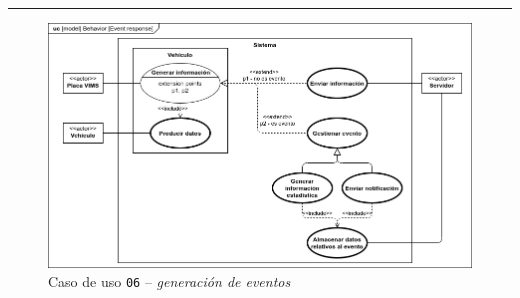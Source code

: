 \noindent\rule{\linewidth}{.2pt}

\begin{figure}[H]
  \centering
  \includegraphics[width=\linewidth]{diagrams/UseCases-UC6 - reaction.png}
  \caption{Caso de uso \texttt{06} -- \textit{generación de eventos}}
  \label{uc:reaction}
\end{figure}

